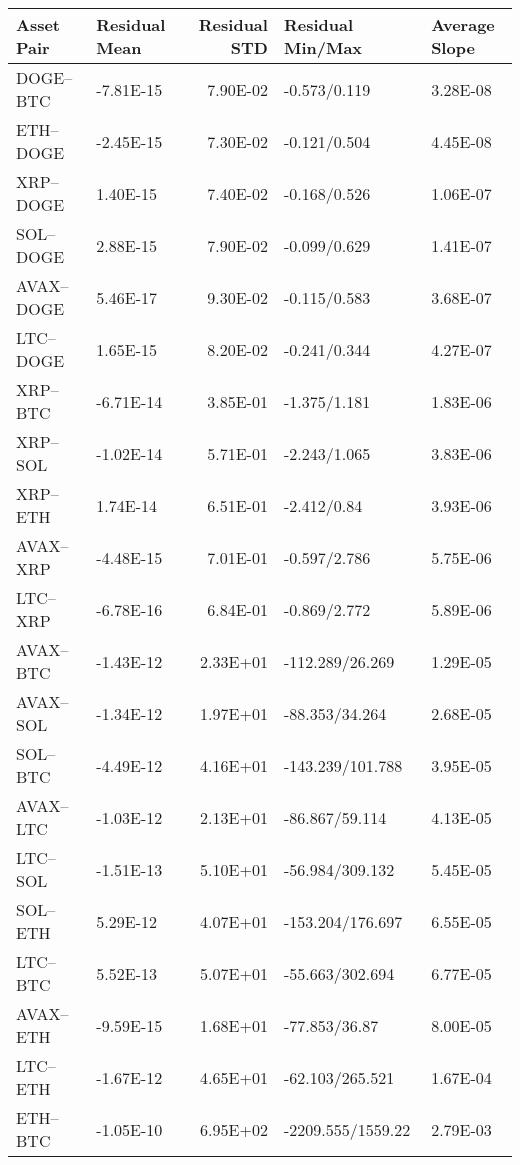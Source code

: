 \begin{tabular}{llrll}
\toprule
Asset Pair & Residual Mean & Residual STD & Residual Min/Max & Average Slope \\
\midrule
DOGE–BTC & -7.81E-15 & 7.90E-02 & -0.573/0.119 & 3.28E-08 \\
ETH–DOGE & -2.45E-15 & 7.30E-02 & -0.121/0.504 & 4.45E-08 \\
XRP–DOGE & 1.40E-15 & 7.40E-02 & -0.168/0.526 & 1.06E-07 \\
SOL–DOGE & 2.88E-15 & 7.90E-02 & -0.099/0.629 & 1.41E-07 \\
AVAX–DOGE & 5.46E-17 & 9.30E-02 & -0.115/0.583 & 3.68E-07 \\
LTC–DOGE & 1.65E-15 & 8.20E-02 & -0.241/0.344 & 4.27E-07 \\
XRP–BTC & -6.71E-14 & 3.85E-01 & -1.375/1.181 & 1.83E-06 \\
XRP–SOL & -1.02E-14 & 5.71E-01 & -2.243/1.065 & 3.83E-06 \\
XRP–ETH & 1.74E-14 & 6.51E-01 & -2.412/0.84 & 3.93E-06 \\
AVAX–XRP & -4.48E-15 & 7.01E-01 & -0.597/2.786 & 5.75E-06 \\
LTC–XRP & -6.78E-16 & 6.84E-01 & -0.869/2.772 & 5.89E-06 \\
AVAX–BTC & -1.43E-12 & 2.33E+01 & -112.289/26.269 & 1.29E-05 \\
AVAX–SOL & -1.34E-12 & 1.97E+01 & -88.353/34.264 & 2.68E-05 \\
SOL–BTC & -4.49E-12 & 4.16E+01 & -143.239/101.788 & 3.95E-05 \\
AVAX–LTC & -1.03E-12 & 2.13E+01 & -86.867/59.114 & 4.13E-05 \\
LTC–SOL & -1.51E-13 & 5.10E+01 & -56.984/309.132 & 5.45E-05 \\
SOL–ETH & 5.29E-12 & 4.07E+01 & -153.204/176.697 & 6.55E-05 \\
LTC–BTC & 5.52E-13 & 5.07E+01 & -55.663/302.694 & 6.77E-05 \\
AVAX–ETH & -9.59E-15 & 1.68E+01 & -77.853/36.87 & 8.00E-05 \\
LTC–ETH & -1.67E-12 & 4.65E+01 & -62.103/265.521 & 1.67E-04 \\
ETH–BTC & -1.05E-10 & 6.95E+02 & -2209.555/1559.22 & 2.79E-03 \\
\bottomrule
\end{tabular}
